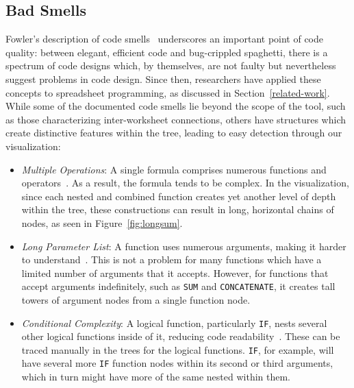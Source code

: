 \documentclass[conference]{IEEEtran}
\begin{document}
	\subsection{Bad Smells} \label{badsmells} Fowler's description of code
	smells~\cite{fowler2009refactoring} underscores an important point of code
	quality: between elegant, efficient code and bug-crippled spaghetti, there is a
	spectrum of code designs which, by themselves, are not faulty but nevertheless
	suggest problems in code design. Since then, researchers have applied
	these concepts to spreadsheet programming, as discussed in
	Section~\ref{related-work}. While some of the documented code smells lie beyond the scope of
	the tool, such as those characterizing inter-worksheet connections, others have
	structures which create distinctive features within the tree, leading to easy
	detection through our visualization: 
	
	\begin{itemize}
		
		\item \textit{Multiple Operations}: A single formula comprises numerous
		functions and operators~\cite{hermans2012detecting}. As a result, the formula
		tends to be complex. In the visualization, since each nested and
		combined function creates yet another level of depth within the tree, these
		constructions can result in long, horizontal chains of nodes, as seen in
		Figure~\ref{fig:longsum}.
		
		\item \textit{Long Parameter List}: A function uses numerous arguments, making
		it harder to understand~\cite{asavametha2012detecting}. This is not a problem
		for many functions which have a limited number of arguments that it accepts.
		However, for functions that accept arguments indefinitely, such as \texttt{SUM} and
		\texttt{CONCATENATE}, it creates tall towers of argument nodes from a single function
		node.
		
		\item \textit{Conditional Complexity}: A logical function, particularly \texttt{IF},
		nests several other logical functions inside of it, reducing code
		readability~\cite{hermans2012detecting}. These can be traced manually in the
		trees for the logical functions. \texttt{IF}, for example, will have several more \texttt{IF}
		function nodes within its second or third arguments, which in turn might have
		more of the same nested within them.
		
	\end{itemize}
	
\end{document}
